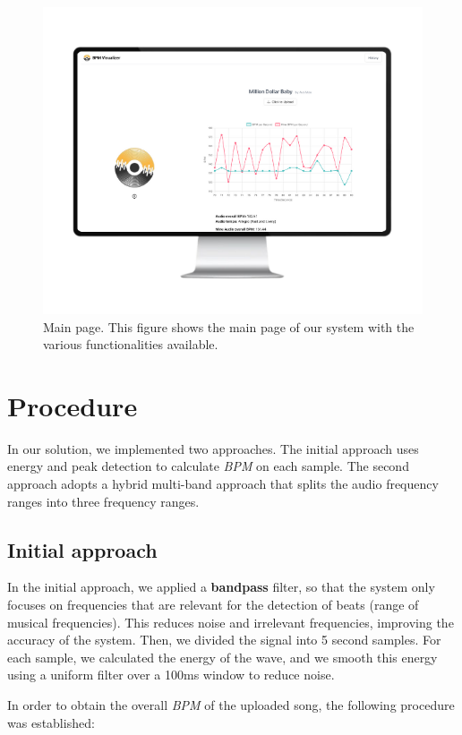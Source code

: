 \documentclass{IEEEtran}
\begin{document}
\begin{figure}[h]
    \centering
    \includegraphics[scale=0.45]{imgs/main_page_with_music_with_pc_frame.png}
    \caption{Main page. This figure shows the main page of our system with the various functionalities available.}
    \label{fig:main_page_with_music}
\end{figure}

\section{Procedure}
In our solution, we implemented two approaches. The initial approach uses energy and peak detection to calculate \textit{BPM} on each sample. The second approach adopts a hybrid multi-band approach that splits the audio frequency ranges into three frequency ranges.

\subsection{Initial approach}
In the initial approach, we applied a \textbf{bandpass} filter, so that the system only focuses on frequencies that are relevant for the detection of beats (range of musical frequencies). This reduces noise and irrelevant frequencies, improving the accuracy of the system. 
Then, we divided the signal into 5 second samples. For each sample, we calculated the energy of the wave, and we smooth this energy using a uniform filter over a 100ms window to reduce noise.

In order to obtain the overall \textit{BPM} of the uploaded song, the following procedure was established:
\end{document}
